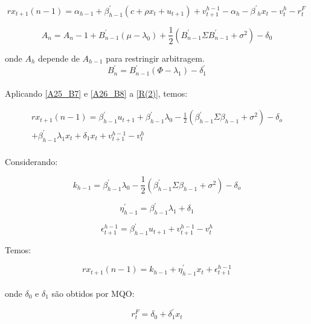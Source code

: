 \documentclass[12pt]{article}
\begin{document}
\begin{equation} \label{R(2)}
rx_{t+1}(n-1)  = \alpha_{h-1} + \beta^{\prime}_{h-1} (c+\rho x_t + u_{t+1}) + v^{h-1}_{t+1} -\alpha_h - \beta^{\prime}{_h} x_t - v^h_t - r^F_t\,
\end{equation}

\begin{equation} \label{A25_B7}
A_n=A_n-1 + B^{\prime}_{n-1}(\mu-\lambda_0) + \frac{1}{2}(B^{\prime}_{n-1} \Sigma B^{\prime}_{n-1} + \sigma^2) - \delta_0
\end{equation}


onde $A_h$ depende de $A_{h-1}$ para restringir arbitragem. 
\\

\begin{equation} \label{A26_B8}
B^{\prime}_n = B^{\prime}_{n-1}(\Phi-\lambda_1) - \delta^{\prime}_1
\end{equation}
\\

Aplicando \ref{A25_B7} e \ref{A26_B8} a \ref{R(2)}, temos:


\begin{equation}  \label{R3}
\begin{split}
rx_{t+1}(n-1)  = \beta^{\prime}_{h-1} u_{t+1} + \beta^{\prime}_{h-1}\lambda_0 - \frac{1}{2}(\beta^{\prime}_{h-1} \Sigma \beta_{h-1} + \sigma^2) - \delta_o \\ + \beta^{\prime}_{h-1} \lambda_1 x_t + \delta_1 x_t + v^{h-1}_{t+1} - v^h_t
\end{split}
\end{equation}
\\

Considerando:

\begin{equation}
k_{h-1} = \beta^{\prime}_{h-1}\lambda_0 - \frac{1}{2}(\beta^{\prime}_{h-1} \Sigma \beta_{h-1} + \sigma^2) - \delta_o
\end{equation} 

\begin{equation} 
\eta^{\prime}_{h-1} = \beta^{\prime}_{h-1} \lambda_1 + \delta_1
\end{equation} 

\begin{equation} 
\epsilon^{h-1}_{t+1} = \beta^{\prime}_{h-1} u_{t+1} + v^{h-1}_{t+1} -v^h_t
\end{equation} 


Temos:

\begin{equation} \label{B9}
rx_{t+1}(n-1) = k_{h-1} + \eta^{\prime}_{h-1} x_t + \epsilon^{h-1}_{t+1} 
\end{equation} 
\\

onde $\delta_0$ e $\delta_1$ são obtidos por MQO:


\begin{equation} 
r^F_t = \delta_0 + \delta^{\prime}_1 x_t
\end{equation} 
\end{document}
